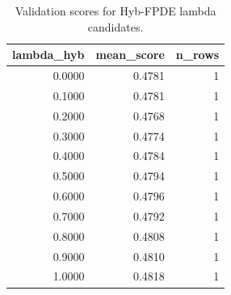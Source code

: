 \begin{table}[t]
\caption{Validation scores for Hyb-FPDE lambda candidates.}
\label{tab:lambda_distribution_computed}
\centering
\begin{tabular}{rrr}
\toprule
lambda\_hyb & mean\_score & n\_rows \\
\midrule
0.0000 & 0.4781 & 1 \\
0.1000 & 0.4781 & 1 \\
0.2000 & 0.4768 & 1 \\
0.3000 & 0.4774 & 1 \\
0.4000 & 0.4784 & 1 \\
0.5000 & 0.4794 & 1 \\
0.6000 & 0.4796 & 1 \\
0.7000 & 0.4792 & 1 \\
0.8000 & 0.4808 & 1 \\
0.9000 & 0.4810 & 1 \\
1.0000 & 0.4818 & 1 \\
\bottomrule
\end{tabular}

\end{table}
